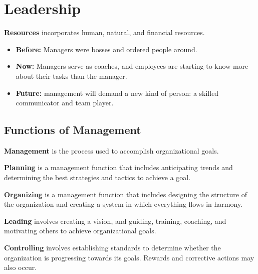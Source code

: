 \documentclass[english, 12pt]{article}
\begin{document}
\section{Leadership}
\begin{defn}
\textbf{Resources} incorporates human, natural, and financial resources.
\end{defn}
\begin{itemize}
\item \textbf{Before:} Managers were bosses and ordered people around.
\item \textbf{Now:} Managers serve as coaches, and employees are starting to know more about their tasks than the manager.
\item \textbf{Future:} management will demand a new kind of person: a skilled communicator and team player.
\end{itemize}
\subsection{Functions of Management}
\begin{defn}
\textbf{Management} is the process used to accomplish organizational goals.
\end{defn}
\begin{defn}
\textbf{Planning} is a management function that includes anticipating trends and determining the best strategies and tactics to achieve a goal.
\end{defn}
\begin{defn}
\textbf{Organizing} is a management function that includes designing the structure of the organization and creating a system in which everything flows in harmony.
\end{defn}
\begin{defn}
\textbf{Leading} involves creating a vision, and guiding, training, coaching, and motivating others to achieve organizational goals.
\end{defn}
\begin{defn}
\textbf{Controlling} involves establishing standards to determine whether the organization is progressing towards its goals. Rewards and corrective actions may also occur.
\end{defn}
\end{document}
